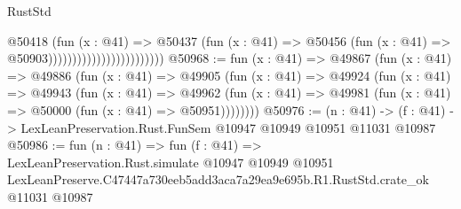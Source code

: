 \begin{lexlean}{RustStd}
\begin{coremodule}
                                            @50418
                                              (fun (x : @41) =>
                                              @50437
                                                (fun (x : @41) =>
                                                @50456
                                                  (fun (x : @41) => @50903))))))))))))))))))))))))
@50968 := fun (x : @41) =>
  @49867
    (fun (x : @41) =>
    @49886
      (fun (x : @41) =>
      @49905
        (fun (x : @41) =>
        @49924
          (fun (x : @41) =>
          @49943
            (fun (x : @41) =>
            @49962
              (fun (x : @41) => @49981 (fun (x : @41) => @50000 (fun (x : @41) => @50951))))))))
@50976 := (n : @41) ->
  (f : @41) -> LexLeanPreservation.Rust.FunSem @10947 @10949 @10951 @11031 @10987
@50986 := fun (n : @41) =>
  fun (f : @41) =>
  LexLeanPreservation.Rust.simulate
    @10947
    @10949
    @10951
    LexLeanPreserve.C47447a730eeb5add3aca7a29ea9e695b.R1.RustStd.crate_ok
    @11031
    @10987
\end{coremodule}
\end{lexlean}
